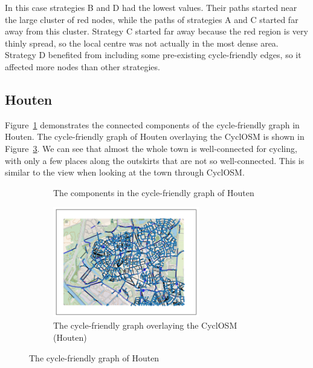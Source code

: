 \documentclass[12pt,a4paper]{report}
\begin{document}
In this case strategies B and D had the lowest values. Their paths started near the large cluster of red nodes, while the paths of strategies A and C started far away from this cluster. Strategy C started far away because the red region is very thinly spread, so the local centre was not actually in the most dense area. Strategy D benefited from including some pre-existing cycle-friendly edges, so it affected more nodes than other strategies.

\subsection{Houten}
Figure~\ref{fig:components houten} demonstrates the connected components of the cycle-friendly graph in Houten. The cycle-friendly graph of Houten overlaying the CyclOSM is shown in Figure~\ref{fig:overlay houten}. We can see that almost the whole town is well-connected for cycling, with only a few places along the outskirts that are not so well-connected. This is similar to the view when looking at the town through CyclOSM.

\begin{figure}[ht!]
    \begin{subfigure}{\textwidth}
        \centering
         {
            
        }
        \caption{The components in the cycle-friendly graph of Houten}
        \label{fig:components houten}
    \end{subfigure}
    \hfill
    \begin{subfigure}{\textwidth}
        \centering
        \includegraphics[width=0.7\textwidth,trim={1cm 1cm 1cm 1cm},clip]{diss_images/eval/overlay_houten.png}
        \caption{The cycle-friendly graph overlaying the CyclOSM (Houten)}
        \label{fig:overlay houten}
    \end{subfigure}
    \caption{The cycle-friendly graph of Houten}
\end{figure}
\end{document}
